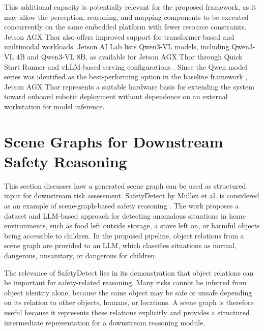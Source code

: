 {{{This additional capacity is potentially relevant for the proposed framework, as it may allow the perception, reasoning, and mapping components to be executed concurrently on the same embedded platform with fewer resource constraints. Jetson AGX Thor also offers improved support for transformer-based and multimodal workloads. Jetson AI Lab lists Qwen3-VL models, including Qwen3-VL 4B and Qwen3-VL 8B, as available for Jetson AGX Thor through Quick Start Runner and vLLM-based serving configurations \cite{jetson_ai_lab_models}. Since the Qwen model series was identified as the best-performing option in the baseline framework \cite{schiel2026online}, Jetson AGX Thor represents a suitable hardware basis for extending the system toward onboard robotic deployment without dependence on an external workstation for model inference.

}
\fi



















\section{Scene Graphs for Downstream Safety Reasoning}

{\small

This section discusses how a generated scene graph can be used as structured input for downstream risk assessment. SafetyDetect by Mullen et al. is considered as an example of scene-graph-based safety reasoning \cite{mullen2024safetydetect}. The work proposes a dataset and LLM-based approach for detecting anomalous situations in home environments, such as food left outside storage, a stove left on, or harmful objects being accessible to children. In the proposed pipeline, object relations from a scene graph are provided to an LLM, which classifies situations as normal, dangerous, unsanitary, or dangerous for children.

The relevance of SafetyDetect lies in its demonstration that object relations can be important for safety-related reasoning. Many risks cannot be inferred from object identity alone, because the same object may be safe or unsafe depending on its relation to other objects, humans, or locations. A scene graph is therefore useful because it represents these relations explicitly and provides a structured intermediate representation for a downstream reasoning module.

}}}
